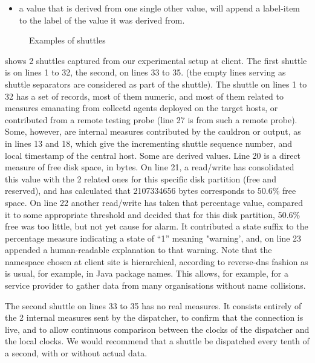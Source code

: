 \begin{itemize}
\begin{itemize}
	\end{itemize}

\item a value that is derived from one single other value, will append a 
label-item to the label of the value it was derived from.  

\end{itemize}

\begin{figure}[ht]
	\caption{Examples of \rawproto{} shuttles} \label{fig:shuttleexamples}
\end{figure}


 shows 2 shuttles captured from our
experimental setup at client. The first shuttle is on lines 1 to 32, the
second, on lines 33 to 35. (the empty lines serving as shuttle separators
are considered as part of the shuttle).  The shuttle on lines 1 to 32
has a set of records, most of them numeric, and most of them related to
measures emanating from collectd agents deployed on the target hosts,
or contributed from a remote testing probe (line 27 is from such a
remote probe). Some, however, are internal measures contributed by the
cauldron or \rawproto{} output, as in lines 13 and 18, which give the
incrementing shuttle sequence number, and local timestamp of the central
host.  Some are derived values. Line 20 is a direct measure of free disk
space, in bytes. On line 21, a read/write \witch{} has consolidated this
value with the 2 related ones for this specific disk partition (free
and reserved), and has calculated that 2107334656 bytes corresponds to
50.6\% free space. On line 22 another read/write \witch{} has taken
that percentage value, compared it to some appropriate threshold and
decided that for this disk partition, 50.6\% free was too little,
but not yet cause for alarm. It contributed a state suffix to the
percentage measure indicating a state of ``1'' meaning "warning', and,
on line 23 appended a human-readable explanation to that warning. Note
that the namespace chosen at client site is hierarchical, according
to reverse-dns fashion as is usual, for example, in Java package names.
This allows, for example, for a service provider to gather data from many
organisations without name collisions.

The second shuttle on lines 33 to 35 has no real measures. It consists
entirely of the 2 internal measures sent by the dispatcher, to confirm
that the connection is live, and to allow continuous comparison between
the clocks of the dispatcher and the local clocks. We would recommend
that a shuttle be dispatched every tenth of a second, with or without
actual data.


